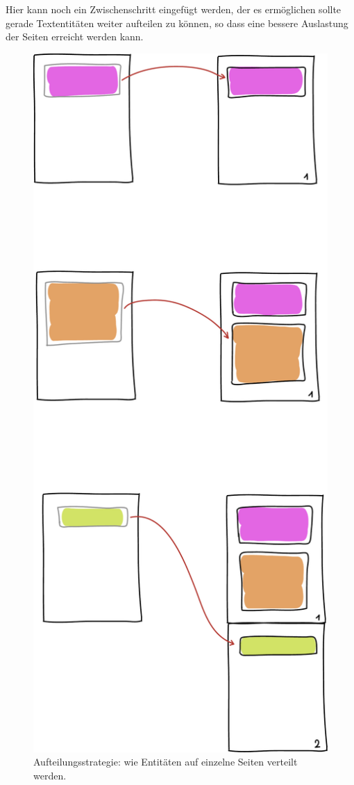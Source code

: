 Hier kann noch ein Zwischenschritt eingefügt werden, der es ermöglichen
sollte gerade Textentitäten weiter aufteilen zu können, so dass eine
bessere Auslastung der Seiten erreicht werden kann.

\newpage
\begin{figure}[h!]
  \centering
    \includegraphics[height=0.9\textheight]{figures/aufteilungsstrategie.pdf}
  \caption{Aufteilungsstrategie: wie Entitäten auf einzelne Seiten
           verteilt werden.}\label{fig-aufteilungsstrategie}
\end{figure}
\newpage

